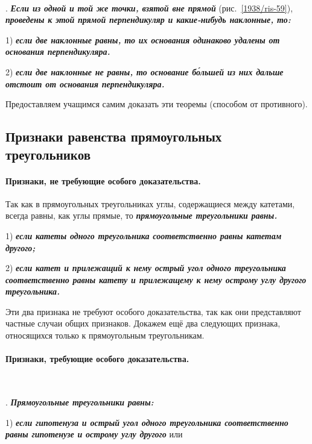 \paragraph{}\label{1938/55}
.
\textbf{\emph{Если из одной и той же точки, взятой вне прямой}} (рис.~\ref{1938/ris-59}), \textbf{\emph{проведены к этой прямой перпендикуляр и какие-нибудь наклонные, то:}}

1) \textbf{\emph{если две наклонные равны, то их основания одинаково удалены от основания перпендикуляра.}}

2) \textbf{\emph{если две наклонные не равны, то основание б\'{о}льшей из них дальше отстоит от основания перпендикуляра.}}

Предоставляем учащимся самим доказать эти теоремы (способом от противного).

\subsection*{Признаки равенства прямоугольных треугольников}

\paragraph{Признаки, не требующие особого доказательства.}\label{1938/56}
Так как в прямоугольных треугольниках углы, содержащиеся между катетами, всегда равны, как углы прямые, то \textbf{\emph{прямоугольные треугольники равны.}}

1) \textbf{\emph{если катеты одного треугольника соответственно равны катетам другого;}}

2) \textbf{\emph{если катет и прилежащий к нему острый угол одного треугольника соответственно равны катету и прилежащему к нему острому углу другого треугольника.}}

Эти два признака не требуют особого доказательства, так как они представляют частные случаи общих признаков.
Докажем ещё два следующих признака, относящихся только к прямоугольным треугольникам.

\paragraph{Признаки, требующие особого доказательства.}\label{1938/57}\ 

.
\textbf{\emph{Прямоугольные треугольники равны:}}

1) \textbf{\emph{если гипотенуза и острый угол одного треугольника соответственно равны гипотенузе и острому углу другого}} или

